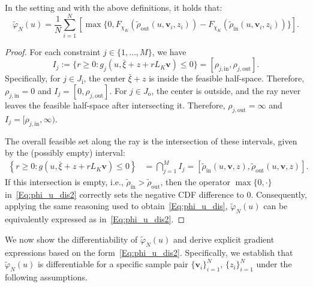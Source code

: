 \documentclass[%
onefignum,onetabnum]{siamonline250211}
\begin{document}
\begin{lemma}
    In the setting and with the above definitions, it holds that:
    \begin{equation}\label{Eq:phi_u_dis2}
        \tilde{\varphi}_N(u)=\frac{1}{N}\sum_{i=1}^N \left[ \max{\{0, F_{\chi_K}(\tilde{\rho}_{\mathrm{out}}(u,\boldsymbol{v}_i,z_i))-F_{\chi_K}(\tilde{\rho}_{\mathrm{in}}(u,\boldsymbol{v}_i,z_i))\}} \right].
    \end{equation}
\end{lemma}

\begin{proof}
    For each constraint $j \in \{1, \dots, M\}$, we have
    \begin{equation*}
        I_j := \{r \ge 0 : g_j(u,\bar{\xi}+z+r L_K\boldsymbol{v}) \le 0\} = [\rho_{j,\mathrm{in}}, \rho_{j,\mathrm{out}}].
    \end{equation*}
    Specifically, for $j \in J_{\mathrm{i}}$, the center $\bar{\xi}+z$ is inside the feasible half-space. Therefore, $\rho_{j,\mathrm{in}} = 0$ and $I_j = [0, \rho_{j,\mathrm{out}}]$. For $j \in J_{\mathrm{o}}$, the center is outside, and the ray never leaves the feasible half-space after intersecting it. Therefore, $\rho_{j,\mathrm{out}} = \infty$ and $I_j = [\rho_{j,\mathrm{in}}, \infty)$.
    
    The overall feasible set along the ray is the intersection of these intervals, given by the (possibly empty) interval:
    \begin{equation*}
        \begin{aligned}
            \left\{r\geq 0: g(u,\bar{\xi}+z+r L_K\boldsymbol{v})\leq 0\right\} &= \bigcap_{j=1}^M I_j = %
            [\tilde{\rho}_{\mathrm{in}}(u,\boldsymbol{v},z), \tilde{\rho}_{\mathrm{out}}(u,\boldsymbol{v},z)].
        \end{aligned}
    \end{equation*}
  If this intersection is empty, i.e., $\tilde{\rho}_{\mathrm{in}} > \tilde{\rho}_{\mathrm{out}}$, then the operator $\max\{0,\cdot\}$ in~\eqref{Eq:phi_u_dis2} correctly sets the negative CDF difference to $0$. Consequently, applying the same reasoning used to obtain~\eqref{Eq:phi_u_dis}, $\tilde{\varphi}_N(u)$ can be equivalently expressed as in~\eqref{Eq:phi_u_dis2}.
\end{proof}

We now show the differentiability of $\tilde{\varphi}_N(u)$ and derive explicit gradient expressions based on the form~\eqref{Eq:phi_u_dis2}. Specifically, we establish that $\tilde{\varphi}_N(u)$ is differentiable for a specific sample pair $\{\boldsymbol{v}_i\}_{i=1}^N$, $\{z_i\}_{i=1}^N$ under the following assumptions.
\end{document}
